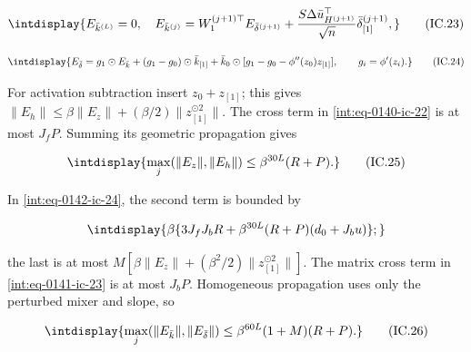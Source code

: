 \begingroup\renewcommand{\theHequation}{intdisplay.322}
\begin{equation}
\intdisplay{
E_{\bar k^{(L)}}=0,\quad
 E_{\bar k^{(j)}}=W_1^{(j+1)\top}E_{\bar\delta^{(j+1)}}
   +\frac{S\Delta\bar u_{H^{(j+1)}}^\top}{\sqrt n}
                  \bar\delta_{[1]}^{(j+1)},
}
\tag{IC.23}
\label{int:eq-0141-ic-23}
\end{equation}
\endgroup

\begingroup\renewcommand{\theHequation}{intdisplay.323}
\begin{equation}
\intdisplay{
E_{\bar\delta}=g_1\odot E_{\bar k}
 +(g_1-g_0)\odot\bar k_{[1]}
 +\bar k_0\odot[g_1-g_0-\phi''(z_0)z_{[1]}],
 \qquad g_i=\phi'(z_i).
}
\tag{IC.24}
\label{int:eq-0142-ic-24}
\end{equation}
\endgroup


For activation subtraction insert \(z_0+z_{[1]}\); this gives \(\|E_h\|\le\beta\|E_z\|+ (\beta/2)\|z_{[1]}^{\odot2}\|\). The cross term in \eqref{int:eq-0140-ic-22} is at most \(J_fP\). Summing its geometric propagation gives


\begingroup\renewcommand{\theHequation}{intdisplay.324}
\begin{equation}
\intdisplay{
\max_j(\|E_z\|,\|E_h\|)\le\beta^{30L}(R+P).
}
\tag{IC.25}
\label{int:eq-0143-ic-25}
\end{equation}
\endgroup


In \eqref{int:eq-0142-ic-24}, the second term is bounded by


\begingroup\renewcommand{\theHequation}{intdisplay.325}
\begin{equation*}
\intdisplay{
\beta\{3J_fJ_bR+\beta^{30L}(R+P)(d_0+J_bu)\};
}
\end{equation*}
\endgroup


the last is at most \(M[\beta\|E_z\|+(\beta^2/2) \|z_{[1]}^{\odot2}\|]\). The matrix cross term in \eqref{int:eq-0141-ic-23} is at most \(J_bP\). Homogeneous propagation uses only the perturbed mixer and slope, so


\begingroup\renewcommand{\theHequation}{intdisplay.326}
\begin{equation}
\intdisplay{
\max_j(\|E_{\bar k}\|,\|E_{\bar\delta}\|)
 \le\beta^{60L}(1+M)(R+P).
}
\tag{IC.26}
\label{int:eq-0144-ic-26}
\end{equation}
\endgroup

